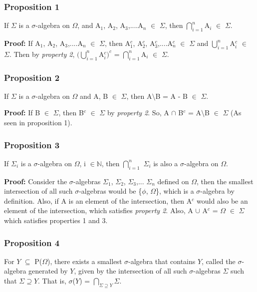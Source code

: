 \documentclass{article}
\begin{document}
\subsubsection{Proposition 1}
If $\Sigma$ is a $\sigma$-algebra on $\Omega$, and A$_1$, A$_2$, A$_3$,....A$_n$ $\in$ $\Sigma$, then $\bigcap\limits_{i=1}^n$A$_i$ $\in$ $\Sigma$.

\textbf{Proof: }If A$_1$, A$_2$, A$_3$,....A$_n$ $\in$ $\Sigma$, then A$_1^c$, A$_2^c$, A$_3^c$,....A$_n^c$ $\in$ $\Sigma$ and $\bigcup\limits_{i=1}^n$A$_i^c$ $\in$ $\Sigma$. Then by \textit{property 2}, $(\bigcup\limits_{i=1}^n$A$_i^c)^c$ = $\bigcap\limits_{i=1}^n$A$_i$ $\in$ $\Sigma$.


\subsubsection{Proposition 2}
If $\Sigma$ is a $\sigma$-algebra on $\Omega$ and A, B $\in$ $\Sigma$, then A$\setminus$B = A - B $\in$ $\Sigma$.\medskip

\textbf{Proof: }If B $\in$ $\Sigma$, then B$^c$ $\in$ $\Sigma$ by  \textit{property 2}. So, A $\cap$ B$^c$ = A$\setminus$B $\in$ $\Sigma$ (As seen in proposition 1).


\subsubsection{Proposition 3}
If $\Sigma_i$ is a $\sigma$-algebra on $\Omega$, i $\in \mathbb{N}$, then $\bigcap\limits_{i=1}^n$ $\Sigma_i$ is also a $\sigma$-algebra on $\Omega$.\medskip

\textbf{Proof: }Consider the $\sigma$-algebras $\Sigma_1$, $\Sigma_2$, $\Sigma_3$,... $\Sigma_n$ defined on $\Omega$, then the smallest intersection of all such $\sigma$-algebras would be \{$\phi$, $\Omega$\}, which is a $\sigma$-algebra by definition. Also, if A is an element of the intersection, then A$^c$ would also be an element of the intersection, which satisfies \textit{property 2}. Also, A $\cup$ A$^c$ = $\Omega$ $\in$ $\Sigma$ which satisfies properties 1 and 3.



\subsubsection{Proposition 4}
For $Y$ $\subseteq$ P($\Omega$), there exists a smallest $\sigma$-algebra that contains $Y$, called the $\sigma$-algebra generated by $Y$, given by the intersection of all such $\sigma$-algebras $\Sigma$ such that $\Sigma \supseteq Y$. That is, $\sigma$($Y$) = $\bigcap\limits_{\Sigma \supseteq Y}\Sigma$.\bigskip
\end{document}
